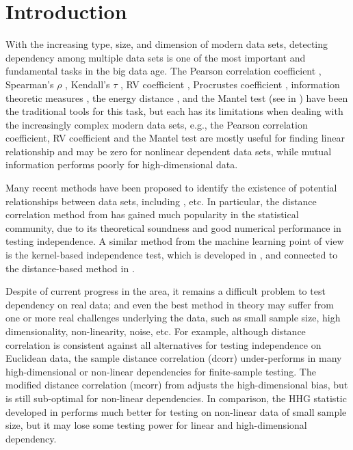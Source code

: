 \documentclass[12pt]{article}
\begin{document}
\section{Introduction}
With the increasing type, size, and dimension of modern data sets, detecting dependency among multiple data sets is one of the most important and fundamental tasks in the big data age. The Pearson correlation coefficient \cite{XXX}, Spearman's $\rho$ \cite{XXX}, Kendall's $\tau$ \cite{XXX},  RV coefficient \cite{XXX}, Procrustes coefficient \cite{XXX}, information theoretic measures \cite{Renyi1959}, the energy distance \cite{XXX}, and the Mantel test (see in \cite{JosseHolmes2013, RobertEscoufier1976, Mantel1967}) have been the traditional tools for this task, but each has its limitations when dealing with the increasingly complex modern data sets, e.g., the Pearson correlation coefficient, RV coefficient and the Mantel test are mostly useful for finding linear relationship and may be zero for nonlinear dependent data sets, while mutual information performs poorly for high-dimensional data. 

Many recent methods have been proposed to identify the existence of potential relationships between data sets, including \cite{Baringhaus2004,TaskinenOjaRandles2005, GrettonEtAl2005, SzekelyRizzoBakirov2007, GrettonGyorfi2010,Reshef2011, HellerGorfine2013, Reimherr2013, SzekelyRizzo2013a}, etc. In particular, the distance correlation method from \cite{SzekelyRizzoBakirov2007}  has gained much popularity in the statistical community, due to its theoretical soundness and good numerical performance in testing independence. A similar method from the machine learning point of view is the kernel-based independence test, which is developed in \cite{GrettonEtAl2005, GrettonGyorfi2010, GrettonEtAl2012}, and connected to the distance-based method in \cite{SejdinovicEtAl2013}.

Despite of current progress in the area, it remains a difficult problem to test dependency on real data; and even the best method in theory may suffer from one or more real challenges underlying the data, such as small sample size, high dimensionality, non-linearity, noise, etc. For example, although distance correlation is consistent against all alternatives for testing independence on Euclidean data, the sample distance correlation (dcorr) under-performs in many high-dimensional or non-linear dependencies for finite-sample testing. The modified distance correlation (mcorr) from \cite{SzekelyRizzo2013a} adjusts the high-dimensional bias, but is still sub-optimal for non-linear dependencies. In comparison, the HHG statistic developed in \cite{HellerGorfine2013} performs much better for testing on non-linear data of small sample size, but it may lose some testing power for linear and high-dimensional dependency.
\end{document}

